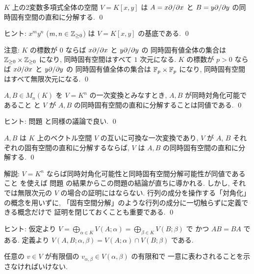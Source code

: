\documentclass[12pt,twoside]{jarticle}
\newcommand\commentout[1]{#1}
\newcommand\commentout[1]{}
\begin{document}

\begin{question}
  $K$ 上の2変数多項式全体の空間 $V=K[x,y]$ 
  は $A=x\partial/\partial x$ と $B=y\partial/\partial y$ の同時固有空間の直和に分解する. \qed
\end{question}

\noindent
ヒント: $x^my^n$ ($m,n\in{\mathbb Z}_{\ge0}$) は $V=K[x,y]$ の基底である.
\qed

\commentout{
\medskip
\noindent
注意: $K$ の標数が $0$ ならば $x\partial/\partial x$ と $y\partial/\partial y$ の
同時固有値全体の集合は ${\mathbb Z}_{\ge0}\times{\mathbb Z}_{\ge0}$ になり, 
同時固有空間はすべて $1$ 次元になる.
$K$ の標数が $p>0$ ならば $x\partial/\partial x$ と $y\partial/\partial y$ の
同時固有値全体の集合は ${\mathbb F}_p\times{\mathbb F}_p$ になり, 
同時固有空間はすべて無限次元になる. 
\qed
}


\begin{question}
\label{q:diag-iff-eigendecomp:A,B}
  $A,B\in M_n(K)$ を $V=K^n$ の一次変換とみなすとき,
  $A,B$ が同時対角化可能であること
  と $V$ が $A,B$ の同時固有空間の直和に分解することは同値である.
  \qed
\end{question}

\noindent
ヒント: 問題  と同様の議論で良い.
\qed


\begin{question}[同時固有空間分解]
\label{q:eigen-decomp:A,B}
  $A,B$ は $K$ 上のベクトル空間 $V$ の互いに可換な一次変換であり, 
  $V$ が $A$, $B$ それぞれの固有空間の直和に分解するならば,
  $V$ は $A,B$ の同時固有空間の直和に分解する.
  \qed
\end{question}

\noindent
解説: $V=K^n$ ならば同時対角化可能性と同時固有空間分解可能性が同値である
こと  を使えば
問題  の結果からこの問題の結論が直ちに導かれる.
しかし, それでは無限次元の $V$ の場合の証明にはならない.
行列の成分を操作する「対角化」の概念を用いずに, 
「固有空間分解」のような行列の成分に一切触らずに定義できる概念だけで
証明を閉じておくことも重要である.  
\qed

\medskip
\noindent
ヒント: 仮定より $V=
\bigoplus_{\alpha\in K}V(A;\alpha)=\bigoplus_{\beta\in K}V(B;\beta)$ で
かつ $AB=BA$ である. 
定義より $V(A,B;\alpha,\beta)=V(A;\alpha)\cap V(B;\beta)$ である.

任意の $v\in V$ が有限個の $v_{\alpha,\beta}\in V(\alpha,\beta)$ の有限和で
一意に表わされることを示さなければいけない.
\end{document}
